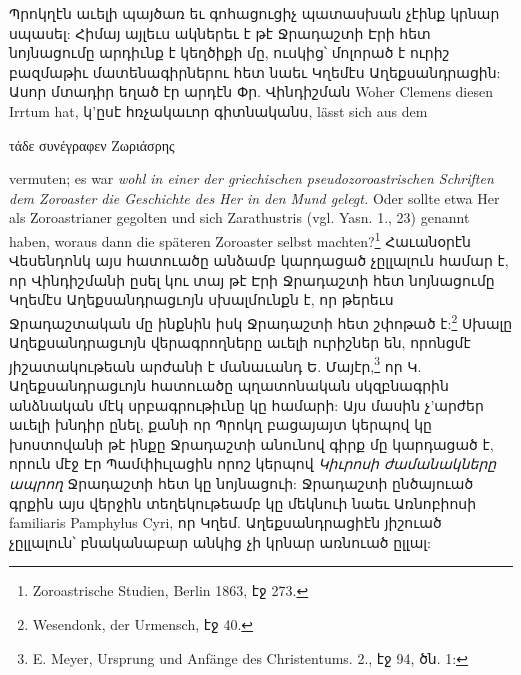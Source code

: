 \documentclass{article}
\begin{document}
{Պրոկղէն աւելի պայծառ եւ գոհացուցիչ պատասխան չէինք կրնար սպասել: Հիմայ այլեւս ակներեւ է թէ Ջրադաշտի Էրի հետ նոյնացումը արդիւնք է կեղծիքի մը, ուսկից՝ մոլորած է ուրիշ բազմաթիւ մատենագիրներու հետ նաեւ Կղեմէս Աղեքսանդրացին: Ասոր մտադիր եղած էր արդէն Փր. Վինդիշման Woher Clemens diesen Irrtum hat, կ'ըսէ հռչակաւոր գիտնականս, lässt sich aus dem \begin{greek}τάδε συνέγραφεν Ζωριάσρης\end{greek} vermuten; es war \emph{wohl in einer der griechischen pseudozoroastrischen Schriften dem Zoroaster die Geschichte des Her in den Mund gelegt.} Oder sollte etwa Her als Zoroastrianer gegolten und sich Zarathustris (vgl. Yasn. 1., 23) genannt haben, woraus dann die späteren Zoroaster selbst machten?\footnote{Zoroastrische Studien, Berlin 1863, էջ 273.} Հաւանօրէն Վեսենդոնկ այս հատուածը անձամբ կարդացած չըլլալուն համար է, որ Վինդիշմանի ըսել կու տայ թէ Էրի Ջրադաշտի հետ նոյնացումը Կղեմէս Աղեքսանդրացւոյն սխալմունքն է, որ թերեւս Ջրադաշտական մը ինքնին իսկ Ջրադաշտի հետ շփոթած է:\footnote{Wesendonk, der Urmensch, էջ 40.} Սխալը Աղեքսանդրացւոյն վերագրողները աւելի ուրիշներ են, որոնցմէ յիշատակութեան արժանի է մանաւանդ Ե. Մայէր,\footnote{E. Meyer, Ursprung und Anfänge des Christentums. 2., էջ 94, ծն. 1:} որ Կ. Աղեքսանդրացւոյն հատուածը պղատոնական սկզբնագրին անձնական մէկ սրբագրութիւնը կը համարի: Այս մասին չ'արժեր աւելի խնդիր ընել, քանի որ Պրոկղ բացայայտ կերպով կը խոստովանի թէ ինքը Ջրադաշտի անունով գիրք մը կարդացած է, որուն մէջ Էր Պամփիւլացին որոշ կերպով \emph{Կիւրոսի ժամանակները ապրող} Ջրադաշտի հետ կը նոյնացուի: Ջրադաշտի ընծայուած գրքին այս վերջին տեղեկութեամբ կը մեկնուի նաեւ Առնոբիոսի familiaris Pamphylus Cyri, որ Կղեմ. Աղեքսանդրացիէն յիշուած չըլլալուն՝ բնականաբար անկից չի կրնար առնուած ըլլալ:

}
\end{document}
